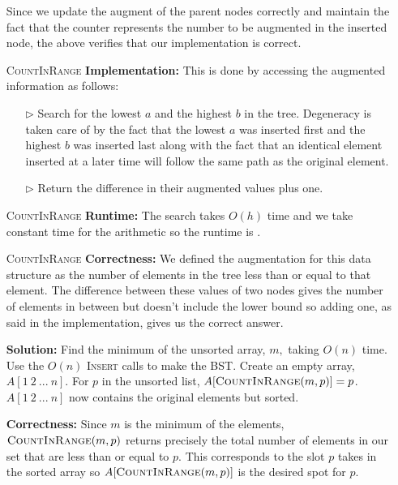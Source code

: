\documentclass[12pt,twoside]{article}
\begin{document}
\begin{problems}
\begin{problemparts}
\begin{itemize}
\begin{itemize}
\end{itemize}
Since we update the augment of the parent nodes correctly and maintain the fact that the counter represents the number to be augmented in the inserted node, the above verifies that our implementation is correct.
\item [\textsc{CountInRange}\textbf{ Implementation:}] This is done by accessing the augmented information as follows:
\begin{itemize}
\item[$\rhd$] Search for the lowest $a$ and the highest $b$ in the tree. Degeneracy is taken care of by the fact that the lowest $a$ was inserted first and the highest $b$ was inserted last along with the fact that an identical element inserted at a later time will follow the same path as the original element.
\item[$\rhd$] Return the difference in their augmented values plus one.
\end{itemize}
\item [\textsc{CountInRange}\textbf{ Runtime:}] The search takes $O(h)$ time and we take constant time for the arithmetic so the runtime is .
\item [\textsc{CountInRange}\textbf{ Correctness:}] We defined the augmentation for this data structure as the number of elements in the tree less than or equal to that element. The difference between these values of two nodes gives the number of elements in between but doesn't include the lower bound so adding one, as said in the implementation, gives us the correct answer.
\end{itemize}
\problempart
\begin{itemize}
\item[\textbf{Solution:}] Find the minimum of the unsorted array, $m,$ taking $O(n)$ time. Use the $O(n)$ \textsc{Insert} calls to make the BST. Create an empty array, $A[1\ 2 \ ... \ n]$. For $p$ in the unsorted list, $A[\textsc{CountInRange}(m,p)]=p$. $A[1\ 2 \ ... \ n]$ now contains the original elements but sorted.
\item[\textbf{Correctness:}] Since $m$ is the minimum of the elements, $\textsc{CountInRange}(m,p)$ returns precisely the total number of elements in our set that are less than or equal to $p$. This corresponds to the slot $p$ takes in the sorted array so $A[\textsc{CountInRange}(m,p)]$ is the desired spot for $p$.
\end{itemize}
\end{problemparts}
\problem
\begin{itemize}

\end{itemize}
\end{problems}
\end{document}
